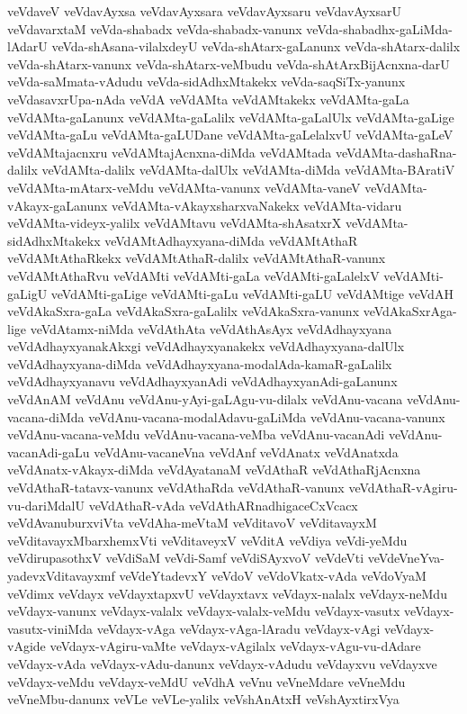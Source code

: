 {veVdaveV
veVdavAyxsa
veVdavAyxsara
veVdavAyxsaru
veVdavAyxsarU
veVdavarxtaM
veVda-shabadx
veVda-shabadx-vanunx
veVda-shabadhx-gaLiMda-lAdarU
veVda-shAsana-vilalxdeyU
veVda-shAtarx-gaLanunx
veVda-shAtarx-dalilx
veVda-shAtarx-vanunx
veVda-shAtarx-veMbudu
veVda-shAtArxBijAcnxna-darU
veVda-saMmata-vAdudu
veVda-sidAdhxMtakekx
veVda-saqSiTx-yanunx
veVdasavxrUpa-nAda
veVdA
veVdAMta
veVdAMtakekx
veVdAMta-gaLa
veVdAMta-gaLanunx
veVdAMta-gaLalilx
veVdAMta-gaLalUlx
veVdAMta-gaLige
veVdAMta-gaLu
veVdAMta-gaLUDane
veVdAMta-gaLelalxvU
veVdAMta-gaLeV
veVdAMtajacnxru
veVdAMtajAcnxna-diMda
veVdAMtada
veVdAMta-dashaRna-dalilx
veVdAMta-dalilx
veVdAMta-dalUlx
veVdAMta-diMda
veVdAMta-BAratiV
veVdAMta-mAtarx-veMdu
veVdAMta-vanunx
veVdAMta-vaneV
veVdAMta-vAkayx-gaLanunx
veVdAMta-vAkayxsharxvaNakekx
veVdAMta-vidaru
veVdAMta-videyx-yalilx
veVdAMtavu
veVdAMta-shAsatxrX
veVdAMta-sidAdhxMtakekx
veVdAMtAdhayxyana-diMda
veVdAMtAthaR
veVdAMtAthaRkekx
veVdAMtAthaR-dalilx
veVdAMtAthaR-vanunx
veVdAMtAthaRvu
veVdAMti
veVdAMti-gaLa
veVdAMti-gaLalelxV
veVdAMti-gaLigU
veVdAMti-gaLige
veVdAMti-gaLu
veVdAMti-gaLU
veVdAMtige
veVdAH
veVdAkaSxra-gaLa
veVdAkaSxra-gaLalilx
veVdAkaSxra-vanunx
veVdAkaSxrAga-lige
veVdAtamx-niMda
veVdAthAta
veVdAthAsAyx
veVdAdhayxyana
veVdAdhayxyanakAkxgi
veVdAdhayxyanakekx
veVdAdhayxyana-dalUlx
veVdAdhayxyana-diMda
veVdAdhayxyana-modalAda-kamaR-gaLalilx
veVdAdhayxyanavu
veVdAdhayxyanAdi
veVdAdhayxyanAdi-gaLanunx
veVdAnAM
veVdAnu
veVdAnu-yAyi-gaLAgu-vu-dilalx
veVdAnu-vacana
veVdAnu-vacana-diMda
veVdAnu-vacana-modalAdavu-gaLiMda
veVdAnu-vacana-vanunx
veVdAnu-vacana-veMdu
veVdAnu-vacana-veMba
veVdAnu-vacanAdi
veVdAnu-vacanAdi-gaLu
veVdAnu-vacaneVna
veVdAnf
veVdAnatx
veVdAnatxda
veVdAnatx-vAkayx-diMda
veVdAyatanaM
veVdAthaR
veVdAthaRjAcnxna
veVdAthaR-tatavx-vanunx
veVdAthaRda
veVdAthaR-vanunx
veVdAthaR-vAgiru-vu-dariMdalU
veVdAthaR-vAda
veVdAthARnadhigaceCxVcacx
veVdAvanuburxviVta
veVdAha-meVtaM
veVditavoV
veVditavayxM
veVditavayxMbarxhemxVti
veVditaveyxV
veVditA
veVdiya
veVdi-yeMdu
veVdirupasothxV
veVdiSaM
veVdi-Samf
veVdiSAyxvoV
veVdeVti
veVdeVneYva-yadevxVditavayxmf
veVdeYtadevxY
veVdoV
veVdoVkatx-vAda
veVdoVyaM
veVdimx
veVdayx
veVdayxtapxvU
veVdayxtavx
veVdayx-nalalx
veVdayx-neMdu
veVdayx-vanunx
veVdayx-valalx
veVdayx-valalx-veMdu
veVdayx-vasutx
veVdayx-vasutx-viniMda
veVdayx-vAga
veVdayx-vAga-lAradu
veVdayx-vAgi
veVdayx-vAgide
veVdayx-vAgiru-vaMte
veVdayx-vAgilalx
veVdayx-vAgu-vu-dAdare
veVdayx-vAda
veVdayx-vAdu-danunx
veVdayx-vAdudu
veVdayxvu
veVdayxve
veVdayx-veMdu
veVdayx-veMdU
veVdhA
veVnu
veVneMdare
veVneMdu
veVneMbu-danunx
veVLe
veVLe-yalilx
veVshAnAtxH
veVshAyxtirxVya
}
